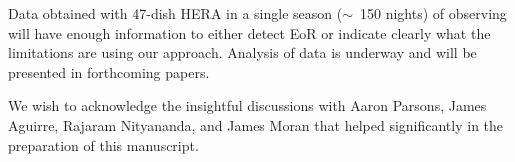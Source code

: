 \documentclass[
reprint,
superscriptaddress,
amsmath,
amssymb,
aps,
prd
]{revtex4-1}
\begin{document}
Data obtained with 47-dish HERA in a single season ($\sim$~150 nights) of observing will have enough information to either detect EoR or indicate clearly what the limitations are using our approach. Analysis of data is underway and will be presented in forthcoming papers.

\begin{acknowledgments}
We wish to acknowledge the insightful discussions with Aaron Parsons, James Aguirre, Rajaram Nityananda, and James Moran that helped significantly in the preparation of this manuscript.
\end{acknowledgments}





\end{document}
